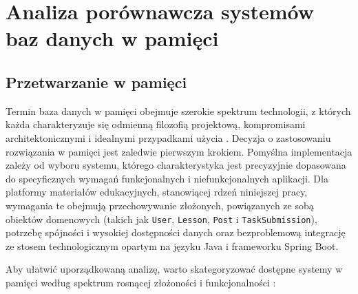 \chapter{Analiza porównawcza systemów baz danych w pamięci}
\section{Przetwarzanie w pamięci}

Termin baza danych w pamięci obejmuje szerokie spektrum technologii, z których każda charakteryzuje się odmienną filozofią projektową, kompromisami architektonicznymi i idealnymi przypadkami użycia \cite{redis-docs,hazelcast-docs}. Decyzja o zastosowaniu rozwiązania w pamięci jest zaledwie pierwszym krokiem. Pomyślna implementacja zależy od wyboru systemu, którego charakterystyka jest precyzyjnie dopasowana do specyficznych wymagań funkcjonalnych i niefunkcjonalnych aplikacji. Dla platformy materiałów edukacyjnych, stanowiącej rdzeń niniejszej pracy, wymagania te obejmują przechowywanie złożonych, powiązanych ze sobą obiektów domenowych (takich jak \texttt{User}, \texttt{Lesson}, \texttt{Post} i \texttt{TaskSubmission}), potrzebę spójności i wysokiej dostępności danych oraz bezproblemową integrację ze stosem technologicznym opartym na języku Java i frameworku Spring Boot.

Aby ułatwić uporządkowaną analizę, warto skategoryzować dostępne systemy w pamięci według spektrum rosnącej złożoności i funkcjonalności \cite{redis-docs,hazelcast-docs}:

